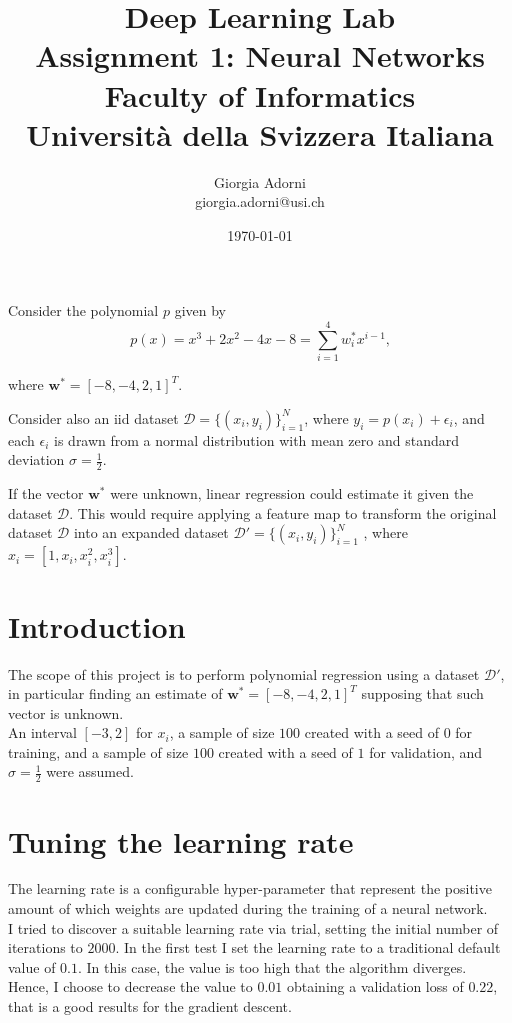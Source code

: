 \documentclass[12pt]{article}
\title{Deep Learning Lab \\ \Large{Assignment 1: Neural Networks} \\[0.3em] \normalsize{Faculty of Informatics} \\ \normalsize{Università della Svizzera Italiana}}
\author {{Giorgia Adorni}	\\ \normalsize{giorgia.adorni@usi.ch}}
\date{\today}
\begin{document}
 
	
	
	\maketitle 
	
	Consider the polynomial $p$ given by
	\begin{equation*}
	 p(x)=x^3+2x^2-4x-8=\sum_{i=1}^4 w_i^*x^{i-1} \mbox{,}
	\end{equation*} 
	
	where $\textbf{w}^*=[-8,-4,2,1]^T$.
	
	Consider also an iid dataset $\mathcal{D} = \{(x_i, y_i)\}^N_{i=1}$, where $y_i = p(x_i)+\epsilon_i$, and each $\epsilon_i$ is drawn from a normal distribution with mean zero and standard deviation $\sigma = \frac{1}{2}$.
	
	If the vector $\textbf{w}^*$ were unknown, linear regression could estimate it given the dataset $\mathcal{D}$. This would require applying a feature map to transform the
	original dataset $\mathcal{D}$ into an expanded dataset $\mathcal{D}'= \{(x_i, y_i)\}^N_{i=1}$ , where $x_i = [1,x_i,x_i^2,x_i^3]$.
	
	\section{Introduction}
	The scope of this {project} is to perform polynomial regression using a dataset $\mathcal{D}'$, in particular finding an estimate of $\textbf{w}^*=[-8,-4,2,1]^T$ supposing that such vector is unknown.\\
	An interval $[-3, 2]$ for $x_i$, a sample of size $100$ created with a seed of $0$ for training, and a sample of size $100$ created with a seed of $1$ for validation, and $\sigma = \frac{1}{2}$ were assumed.
	
	\section{Tuning the learning rate}
	The learning rate is a configurable hyper-parameter that represent the positive amount of which weights are updated during the training of a neural network.\\
	I tried to discover a suitable learning rate via trial, setting the initial number of iterations to $2000$.
	In the first test I set the learning rate to a traditional default value of $0.1$. In this case, the value is too high that the algorithm diverges.\\
	Hence, I choose to decrease the value to $0.01$ obtaining a validation loss of $0.22$, that is a good results for the gradient descent.
		
\end{document}

